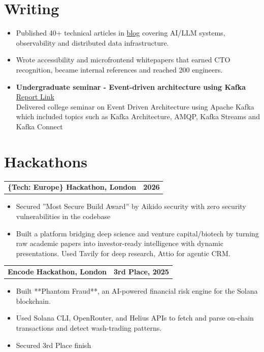 \documentclass[a4paper,10pt]{article}
\makeatletter
\newcommand{\resumeItem}[1]{\item\small #1}
\newcommand{\resumeProjectHeading}[2]{
  \item[]
  \begin{tabular*}{\textwidth}{l@{\extracolsep{\fill}}r}
    \textbf{#1} & \textbf{\small #2}
  \end{tabular*}\vspace{-4pt}
}
\newcommand{\resumeItemListStart}{\begin{itemize}[leftmargin=14pt,itemsep=1.4pt,topsep=2pt,parsep=0pt]}
\newcommand{\resumeItemListEnd}{\end{itemize}\vspace{1pt}}
\makeatother
\begin{document}
\section{Writing}
\begin{itemize}[leftmargin=14pt,itemsep=1.4pt,topsep=1pt]
  \small
  \item Published 40+ technical articles in  \href{https://aymanace2049.hashnode.dev}{blog} covering AI/LLM systems, observability and distributed data infrastructure.
  \item Wrote accessibility and microfrontend whitepapers that earned CTO recognition, became internal references and reached 200 engineers.
  \item \textbf{Undergraduate seminar -  Event-driven architecture using Kafka} \href{https://drive.google.com/file/d/1txqBQZaRxxT7wu5csBuIHUfi8DrRvUMU/view?usp=sharing}{Report Link} \\ Delivered college seminar on Event Driven Architecture using Apache Kafka which
included topics such as Kafka Architecture, AMQP, Kafka Streams and Kafka
Connect
\end{itemize}

\section{Hackathons}

  \resumeProjectHeading{\textbf{\{Tech: Europe\} Hackathon, London}}{ 2026}
  \resumeItemListStart
    \resumeItem{Secured ''Most Secure Build Award'' by Aikido security with zero security vulnerabilities in the codebase}
    \resumeItem{Built a platform bridging deep science and venture capital/biotech by turning raw academic papers into investor-ready intelligence with dynamic presentations. Used Tavily for deep research, Attio for agentic CRM.}
  \resumeItemListEnd

  \resumeProjectHeading{\textbf{Encode Hackathon, London }}{3rd Place, 2025}
  \resumeItemListStart
    \resumeItem{Built **Phantom Fraud**, an AI-powered financial risk engine for the Solana blockchain.}
  \resumeItem{Used Solana CLI, OpenRouter, and Helius APIs to fetch and parse on-chain transactions and detect wash-trading patterns.}
      \resumeItem{Secured 3rd Place finish}
  \resumeItemListEnd
\end{document}
